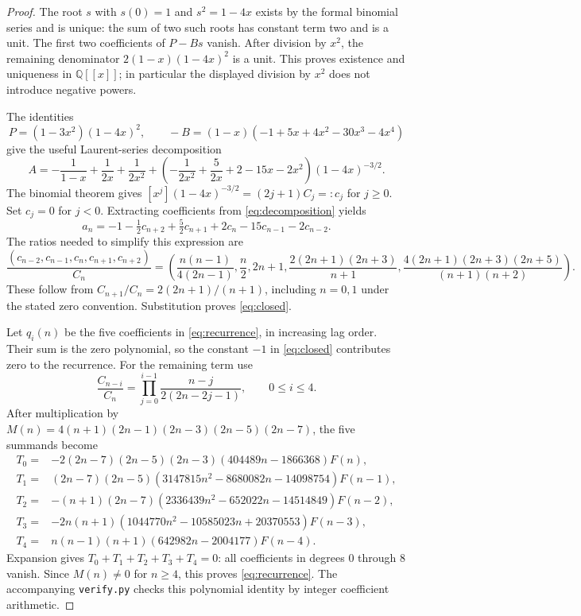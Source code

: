 \documentclass[10pt]{article}
\begin{document}
\begin{proof}
The root $s$ with $s(0)=1$ and $s^2=1-4x$ exists by the formal binomial
series and is unique: the sum of two such roots has constant term two and
is a unit. The first two coefficients of $P-Bs$ vanish. After division by
$x^2$, the remaining denominator $2(1-x)(1-4x)^2$ is a unit. This proves
existence and uniqueness in $\mathbb Q[[x]]$; in particular the displayed
division by $x^2$ does not introduce negative powers.

The identities
\[
 P=(1-3x^2)(1-4x)^2,\qquad
 -B=(1-x)(-1+5x+4x^2-30x^3-4x^4)
\]
give the useful Laurent-series decomposition
\begin{equation}
 A=-\frac1{1-x}+\frac1{2x}+\frac1{2x^2}
 +\left(-\frac1{2x^2}+\frac5{2x}+2-15x-2x^2\right)(1-4x)^{-3/2}.
 \label{eq:decomposition}
\end{equation}
The binomial theorem gives
$[x^j](1-4x)^{-3/2}=(2j+1)C_j=:c_j$ for $j\geq0$.
Set $c_j=0$ for $j<0$. Extracting coefficients from
\eqref{eq:decomposition} yields
\[
 a_n=-1-\tfrac12c_{n+2}+\tfrac52c_{n+1}+2c_n-15c_{n-1}-2c_{n-2}.
\]
The ratios needed to simplify this expression are
\begin{equation}
 \frac{(c_{n-2},c_{n-1},c_n,c_{n+1},c_{n+2})}{C_n}
 =\left(\frac{n(n-1)}{4(2n-1)},\frac n2,2n+1,
 \frac{2(2n+1)(2n+3)}{n+1},
 \frac{4(2n+1)(2n+3)(2n+5)}{(n+1)(n+2)}\right).
 \label{eq:ratios}
\end{equation}
These follow from $C_{n+1}/C_n=2(2n+1)/(n+1)$, including $n=0,1$
under the stated zero convention. Substitution proves \eqref{eq:closed}.

Let $q_i(n)$ be the five coefficients in \eqref{eq:recurrence}, in
increasing lag order. Their sum is the zero polynomial, so the constant
$-1$ in \eqref{eq:closed} contributes zero to the recurrence. For the
remaining term use
\[
 \frac{C_{n-i}}{C_n}=\prod_{j=0}^{i-1}\frac{n-j}{2(2n-2j-1)},
 \qquad 0\leq i\leq4.
\]
After multiplication by
$M(n)=4(n+1)(2n-1)(2n-3)(2n-5)(2n-7)$, the five summands become
\begin{align*}
T_0={}&-2(2n-7)(2n-5)(2n-3)(404489n-1866368)F(n),\\
T_1={}&(2n-7)(2n-5)(3147815n^2-8680082n-14098754)F(n-1),\\
T_2={}&-(n+1)(2n-7)(2336439n^2-652022n-14514849)F(n-2),\\
T_3={}&-2n(n+1)(1044770n^2-10585023n+20370553)F(n-3),\\
T_4={}&n(n-1)(n+1)(642982n-2004177)F(n-4).
\end{align*}
Expansion gives $T_0+T_1+T_2+T_3+T_4=0$: all coefficients in degrees
$0$ through $8$ vanish. Since $M(n)\ne0$ for $n\geq4$, this proves
\eqref{eq:recurrence}. The accompanying \texttt{verify.py} checks this
polynomial identity by integer coefficient arithmetic.
\end{proof}
\end{document}
